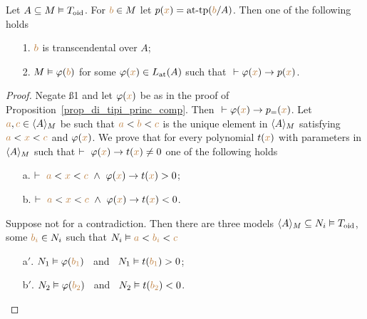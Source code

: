 \begin{proposition}\label{prop_di_tipi princ_comp}
  Let $A\subseteq M\models T_{\rm oid}$.
  For ${\mr b}\in M$ let $p({\mr x})=\attp({\mr b}/A)$.
  Then one of the following holds 
  \begin{itemize}
  \item[1.] ${\mr b}$ is transcendental over $A$;
  \item[2.] $M\models\phi({\mr b})$ for some $\phi({\mr x})\in L_{\rm at}(A)$ such that $\ \proves\phi({\mr x})\imp p({\mr x})$.
  \end{itemize}
\end{proposition}

\begin{proof}
  Negate \ss1 and let $\phi({\mr x})$ be as in the proof of Proposition~\ref{prop_di_tipi_princ_comp}.
  Then $\ \proves\phi({\mr x})\imp p_{=}({\mr x})$.
  Let ${\mr a},{\mr c}\in\<A\>_M$ be such that ${\mr a}<{\mr b}<{\mr c}$ is the unique element in $\<A\>_M$ satisfying ${\mr a}<{\mr x}<{\mr c}$ and $\phi({\mr x})$.
  We prove that for every polynomial $t({\mr x})$ with parameters in $\<A\>_M$ such that $\proves\ \phi({\mr x})\imp t({\mr x})\neq0$ one of the following holds
  \begin{itemize}
  \item[a.] $\proves\   {\mr a}<{\mr x}<{\mr c}\ \wedge\ \phi({\mr x})\imp t({\mr x})>0$;
  \item[b.] $\proves\   {\mr a}<{\mr x}<{\mr c}\ \wedge\ \phi({\mr x})\imp t({\mr x})<0$.
  \end{itemize}
  
  Suppose not for a contradiction. 
  Then there are three models $\<A\>_M\subseteq N_i\models T_{\rm oid}$, some ${\mr b_i}\in N_i$ such that $N_i\models{\mr a}<{\mr b_i}<{\mr c}$
  \begin{itemize}
  \item[a$'$.] $N_1\models \phi({\mr b_1})$ \ and \ $N_1\models t({\mr b_1})>0$;
  \item[b$'$.] $N_2\models \phi({\mr b_2})$ \ and \ $N_2\models t({\mr b_2}) < 0$.
  \end{itemize} 
\end{proof}